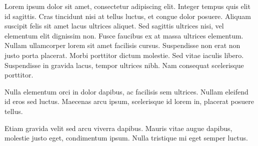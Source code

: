 Lorem ipsum dolor sit amet, consectetur adipiscing elit. Integer tempus quis elit id sagittis. Cras tincidunt nisi at tellus luctus, et congue dolor posuere. Aliquam suscipit felis sit amet lacus ultrices aliquet. Sed sagittis ultrices nisi, vel elementum elit dignissim non. Fusce faucibus ex at massa ultrices elementum. Nullam ullamcorper lorem sit amet facilisis cursus. Suspendisse non erat non justo porta placerat. Morbi porttitor dictum molestie. Sed vitae iaculis libero. Suspendisse in gravida lacus, tempor ultrices nibh. Nam consequat scelerisque porttitor.

Nulla elementum orci in dolor dapibus, ac facilisis sem ultrices. Nullam eleifend id eros sed luctus. Maecenas arcu ipsum, scelerisque id lorem in, placerat posuere tellus. 

Etiam gravida velit sed arcu viverra dapibus. Mauris vitae augue dapibus, molestie justo eget, condimentum ipsum. Nulla tristique mi eget semper luctus. 


